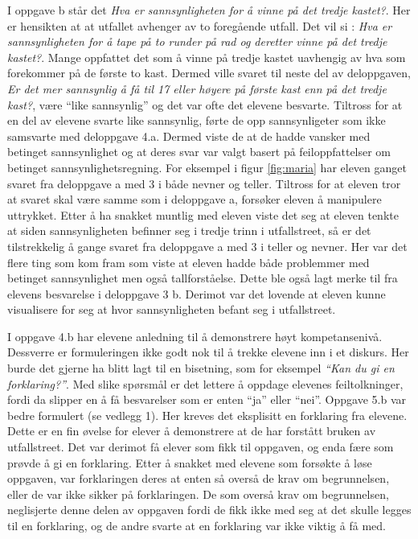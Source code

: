\documentclass[main.tex]{subfiles}
\begin{document}
I oppgave b står det \emph{Hva er sannsynligheten for å vinne på det tredje kastet?}. Her er hensikten at
at utfallet avhenger av to foregående utfall. Det vil si : \emph{Hva er sannsynligheten for å 
tape på to runder på rad og deretter vinne på det tredje kastet?}. Mange oppfattet det som å vinne på tredje kastet 
uavhengig av hva som forekommer på de første to kast. Dermed ville svaret til neste del av deloppgaven, \emph{Er det mer 
sannsynlig å få til 17 eller høyere på første kast enn på det tredje kast?},  være ``like sannsynlig'' og det var ofte 
det elevene besvarte. Tiltross for at en del av elevene svarte like sannsynlig, førte de opp sannsynligeter som 
ikke samsvarte med deloppgave 4.a. Dermed viste de at de hadde vansker med betinget sannsynlighet og at deres svar var 
valgt basert på feiloppfattelser om betinget sannsynlighetsregning. For eksempel i figur \ref{fig:maria} har eleven 
ganget svaret fra deloppgave a med 3 i både nevner og teller. Tiltross for at eleven tror at svaret skal være samme som 
i deloppgave a, forsøker eleven å manipulere uttrykket. Etter å ha snakket muntlig med eleven viste det seg at eleven 
tenkte at siden sannsynligheten befinner seg i tredje trinn i utfallstreet, så er det tilstrekkelig å gange svaret fra 
deloppgave a med 3 i teller og nevner. Her var det flere ting som kom fram som viste at eleven hadde både problemmer
med betinget sannsynlighet men også tallforståelse. Dette ble også lagt merke til fra elevens besvarelse i deloppgave 3 
b. Derimot var det lovende at eleven kunne visualisere for seg at hvor sannsynligheten befant seg i utfallstreet. 


I oppgave 4.b har elevene anledning til å demonstrere høyt kompetansenivå. Dessverre er formuleringen ikke
godt nok til å trekke elevene inn i et diskurs. Her burde det gjerne ha blitt lagt til en bisetning, som 
for eksempel \emph{``Kan du gi en forklaring?''}. Med slike spørsmål er det lettere å oppdage elevenes
feiltolkninger, fordi da slipper en å få besvarelser som er enten ``ja'' eller ``nei''. Oppgave 
5.b var bedre formulert (se vedlegg 1). Her kreves det eksplisitt en forklaring fra elevene.
Dette er en fin øvelse for elever å demonstrere at de har forstått bruken av utfallstreet. Det var derimot
få elever som fikk til oppgaven, og enda fære som prøvde å gi en forklaring. Etter å snakket med elevene
som forsøkte å løse oppgaven, var forklaringen deres at enten så overså de krav om begrunnelsen, eller de var
ikke sikker på forklaringen. De som overså krav om begrunnelsen, neglisjerte denne delen av oppgaven fordi
de fikk ikke med seg at det skulle legges til en forklaring, og de andre svarte at en forklaring var ikke
viktig å få med.
\end{document}
